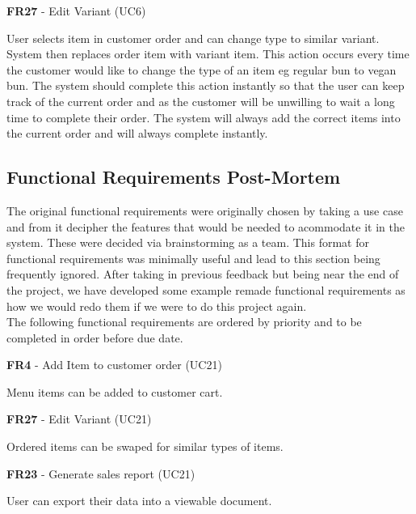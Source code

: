 \noindent \textbf{FR27} - Edit Variant (UC6)\\
\begin{small}
	User selects item in customer order and can change type to similar variant. System then replaces order item with variant item. This action occurs every time the customer would like to change the type of an item eg regular bun to vegan bun. The system should complete this action instantly so that the user can keep track of the current order and as the customer will be unwilling to wait a long time to complete their order. The system will always add the correct items into the current order and will always complete instantly.\\
\end{small}
\linebreak

\subsection{Functional Requirements Post-Mortem}
The original functional requirements were originally chosen by taking a use case and from it decipher the features that would be needed to acommodate it in the system. These were decided via brainstorming as a team.
This format for functional requirements was minimally useful and lead to this section being frequently ignored. After taking in previous feedback but being near the end of the project, we have developed some example remade functional requirements as
how we would redo them if we were to do this project again. \\
\linebreak
The following functional requirements are ordered by priority and to be completed in order before due date.

\noindent \textbf{FR4} - Add Item to customer order (UC21)\\
\begin{small}
	Menu items can be added to customer cart.
\end{small}
\linebreak

\noindent \textbf{FR27} - Edit Variant (UC21)\\
\begin{small}
	Ordered items can be swaped for similar types of items.
\end{small}
\linebreak

\noindent \textbf{FR23} - Generate sales report (UC21)\\
\begin{small}
	User can export their data into a viewable document.
\end{small}
\linebreak
